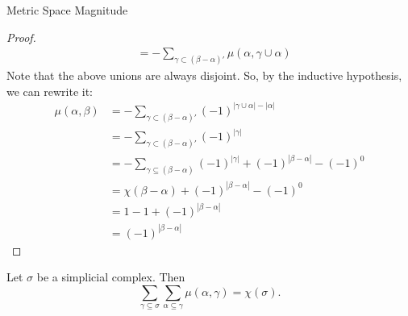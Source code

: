 \documentclass[12pt]{pom_thesis}
\begin{document}
\begin{chapter}{Metric Space Magnitude}
\begin{proof}
\begin{align*}
&= - \sum_{\gamma \subset (\beta - \alpha)'} \mu(\alpha, \gamma \cup \alpha) 
\end{align*}
Note that the above unions are always disjoint. So, by the inductive hypothesis, we can rewrite it:
\begin{align*}
\mu(\alpha, \beta) &= - \sum_{\gamma \subset (\beta - \alpha)'} (-1)^{|\gamma \cup \alpha| - |\alpha|} \\ %
&= - \sum_{\gamma \subset (\beta - \alpha)'} (-1)^{|\gamma|}\\ %
&= - \sum_{\gamma \subseteq (\beta - \alpha)} (-1)^{|\gamma|} + (-1)^{|\beta - \alpha|} - (-1)^0 \\ %
&= \chi(\beta - \alpha) + (-1)^{|\beta - \alpha|} - (-1)^0\\
&= 1-1+ (-1)^{|\beta - \alpha|}\\
&= (-1)^{|\beta - \alpha|}
\end{align*}


\end{proof}
\begin{thm}
\label{consistentEuler}
Let $\sigma$ be a simplicial complex. Then 
\[
\sum_{\gamma \subseteq \sigma} \sum_{\alpha \subseteq \gamma} \mu(\alpha, \gamma) = \chi(\sigma).
\]


\end{thm}
\end{chapter}
\end{document}
